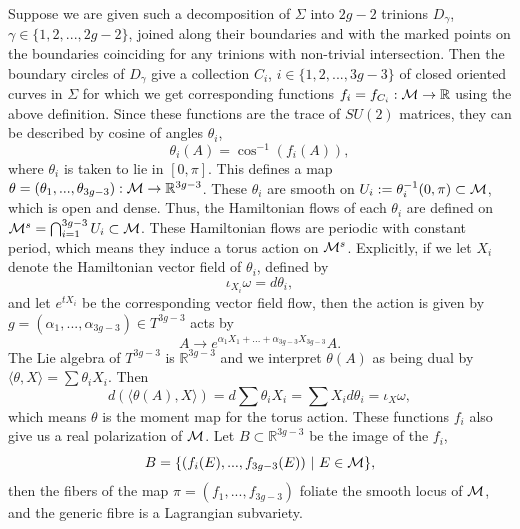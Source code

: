 	Suppose we are given such a decomposition of $\Sigma$ into $2g-2$ trinions $D_\gamma$, $\gamma\in\{1,2,...,2g-2\}$, joined along their boundaries and with the marked points on the boundaries coinciding for any trinions with non-trivial intersection. Then the boundary circles of $D_\gamma$ give a collection $C_i$, $i\in\{1,2,...,3g-3\}$ of closed oriented curves in $\Sigma$ for which we get corresponding functions $f_i = f_{C_i}:\mathcal{M} \to \mathbb{R}$ using the above definition. Since these functions are the trace of $SU(2)$ matrices, they can be described by cosine of angles $\theta_i$,
	\begin{equation}
		\theta_i(A) = \cos^{-1}(f_i(A)),
	\end{equation}
	where $\theta_i$ is taken to lie in $[0,\pi]$. This defines a map $\theta = (\theta_1,...,\theta_{3g-3}):\mathcal{M} \to \mathbb{R}^{3g-3}$. These $\theta_i$ are smooth on $U_i := \theta_i^{-1}(0,\pi) \subset \mathcal{M}$, which is open and dense. Thus, the Hamiltonian flows of each $\theta_i$ are defined on $\mathcal{M}^{s} = \bigcap_{i=1}^{3g-3} U_i \subset \mathcal{M}$. These Hamiltonian flows are periodic with constant period, which means they induce a torus action on $\mathcal{M}^{s}$. Explicitly, if we let $X_i$ denote the Hamiltonian vector field of $\theta_i$, defined by
	\begin{equation}
		\iota_{X_i}\omega = d\theta_i,
	\end{equation}
	and let $e^{tX_i}$ be the corresponding vector field flow, then the action is given by $g = (\alpha_1,...,\alpha_{3g-3}) \in T^{3g-3}$ acts by
	\begin{equation}
		A \to e^{\alpha_1 X_1 + ... + \alpha_{3g-3}X_{3g-3}}A.
	\end{equation}
	 The Lie algebra of $T^{3g-3}$ is $
	\mathbb{R}^{3g-3}$ and we interpret $\theta(A)$ as being dual by $\langle \theta, X \rangle = \sum \theta_i X_i$. Then
	\begin{equation}
		d\left(\langle \theta(A),X\rangle\right) = d\sum\theta_i X_i = \sum X_i d\theta_i = \iota_{X}\omega,
	\end{equation}
	which means $\theta$ is the moment map for the torus action. These functions $f_i$ also give us a real polarization of $\mathcal{M}$. Let $B \subset \mathbb{R}^{3g-3}$ be the image of the $f_i$,
	\begin{equation}
		B = \{(f_i(E),...,f_{3g-3}(E))~|~ E \in \mathcal{M}\},
		\label{e:B-def}
	\end{equation}
	then the fibers of the map $\pi = (f_1,...,f_{3g-3})$ foliate the smooth locus of $\mathcal{M}$, and the generic fibre is a Lagrangian subvariety. 
	
